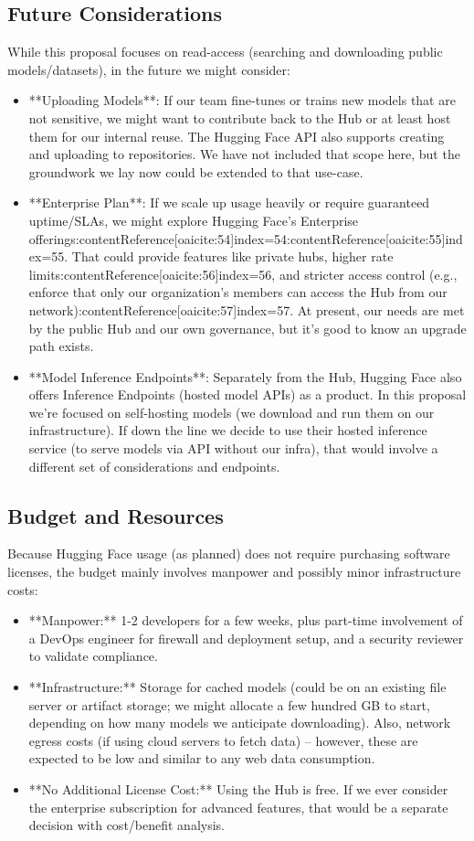 \documentclass{article}
\begin{document}
\subsection*{Future Considerations}
While this proposal focuses on read-access (searching and downloading public models/datasets), in the future we might consider:
\begin{itemize}
    \item **Uploading Models**: If our team fine-tunes or trains new models that are not sensitive, we might want to contribute back to the Hub or at least host them for our internal reuse. The Hugging Face API also supports creating and uploading to repositories. We have not included that scope here, but the groundwork we lay now could be extended to that use-case.
    \item **Enterprise Plan**: If we scale up usage heavily or require guaranteed uptime/SLAs, we might explore Hugging Face’s Enterprise offerings:contentReference[oaicite:54]{index=54}:contentReference[oaicite:55]{index=55}. That could provide features like private hubs, higher rate limits:contentReference[oaicite:56]{index=56}, and stricter access control (e.g., enforce that only our organization’s members can access the Hub from our network):contentReference[oaicite:57]{index=57}. At present, our needs are met by the public Hub and our own governance, but it’s good to know an upgrade path exists.
    \item **Model Inference Endpoints**: Separately from the Hub, Hugging Face also offers Inference Endpoints (hosted model APIs) as a product. In this proposal we’re focused on self-hosting models (we download and run them on our infrastructure). If down the line we decide to use their hosted inference service (to serve models via API without our infra), that would involve a different set of considerations and endpoints.
\end{itemize}

\subsection*{Budget and Resources}
Because Hugging Face usage (as planned) does not require purchasing software licenses, the budget mainly involves manpower and possibly minor infrastructure costs:
\begin{itemize}
    \item **Manpower:** 1-2 developers for a few weeks, plus part-time involvement of a DevOps engineer for firewall and deployment setup, and a security reviewer to validate compliance.
    \item **Infrastructure:** Storage for cached models (could be on an existing file server or artifact storage; we might allocate a few hundred GB to start, depending on how many models we anticipate downloading). Also, network egress costs (if using cloud servers to fetch data) – however, these are expected to be low and similar to any web data consumption.
    \item **No Additional License Cost:** Using the Hub is free. If we ever consider the enterprise subscription for advanced features, that would be a separate decision with cost/benefit analysis.
\end{itemize}
\end{document}
